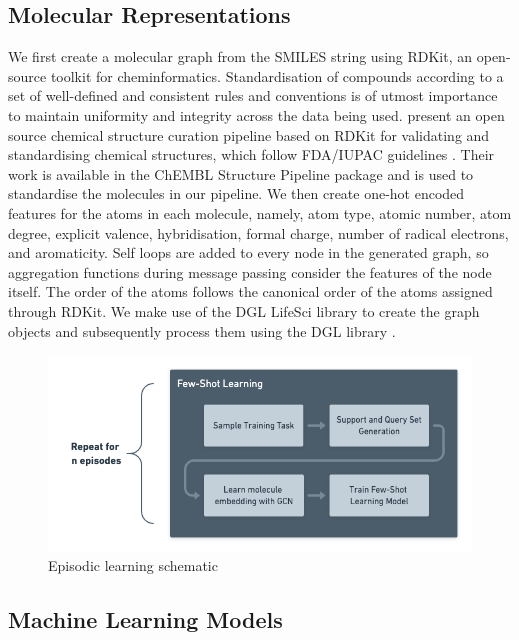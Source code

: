 \documentclass[journal=acscii,manuscript=article]{achemso}
\begin{document}
\subsection{Molecular Representations}

We first create a molecular graph from the SMILES string using RDKit, an open-source toolkit for cheminformatics. Standardisation of compounds according to a set of well-defined and consistent rules and conventions is of utmost importance to maintain uniformity and integrity across the data being used. \citet{bento2020open} present an open source chemical structure curation pipeline based on RDKit for validating and standardising chemical structures, which follow FDA/IUPAC guidelines \citep{brecher2006graphical, food2007substance}. Their work is available in the ChEMBL Structure Pipeline package \cite{bento2020open} and is used to standardise the molecules in our pipeline. We then create one-hot encoded features for the atoms in each molecule, namely, atom type, atomic number, atom degree, explicit valence, hybridisation, formal charge, number of radical electrons, and aromaticity. Self loops are added to every node in the generated graph, so aggregation functions during message passing consider the features of the node itself. The order of the atoms follows the canonical order of the atoms assigned through RDKit. We make use of the DGL LifeSci \cite{dgllife} library to create the graph objects and subsequently process them using the DGL library \cite{wang2019dgl}.

\begin{figure}[h]
  \centering
  \includegraphics[width=0.9\linewidth]{img/episodic-learning.png}
  \caption{Episodic learning schematic}
  \label{fig:episodiclearning}
\end{figure}

\subsection{Machine Learning Models}
\end{document}
